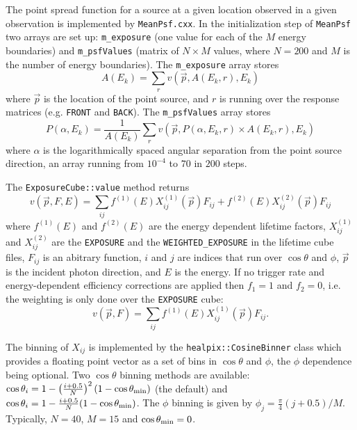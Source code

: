 \documentclass{article}[12pt,a4]
\begin{document}
The point spread function for a source at a given location observed in a given
observation is implemented by {\tt MeanPsf.cxx}.
In the initialization step of {\tt MeanPsf} two arrays are set up:
{\tt m\_exposure} (one value for each of the $M$ energy boundaries) and
{\tt m\_psfValues} (matrix of $N \times M$ values, where $N=200$ and $M$ is
the number of energy boundaries).
The {\tt m\_exposure} array stores
\begin{equation}
A(E_k) = \sum_r v(\vec{p}, A(E_k, r), E_k)
\end{equation}
where 
$\vec{p}$ is the location of the point source, and
$r$ is running over the response matrices (e.g. {\tt FRONT} and {\tt BACK}).
The {\tt m\_psfValues} array stores
\begin{equation}
P(\alpha, E_k) = \frac{1}{A(E_k)} \sum_r v(\vec{p}, P(\alpha, E_k, r) \times A(E_k, r), E_k)
\end{equation}
where
$\alpha$ is the logarithmically spaced angular separation from the point
source direction, an array running from $10^{-4}$ to $70$ in $200$ steps.

The {\tt ExposureCube::value} method returns
\begin{equation}
v(\vec{p}, F, E) = \sum_{ij} f^{(1)}(E) X_{ij}^{(1)}(\vec{p}) F_{ij} + f^{(2)}(E) X_{ij}^{(2)}(\vec{p}) F_{ij}
\end{equation}
where 
$f^{(1)}(E)$ and $f^{(2)}(E)$ are the energy dependent lifetime factors,
$X_{ij}^{(1)}$ and $X_{ij}^{(2)}$ are the {\tt EXPOSURE} and the 
{\tt WEIGHTED\_EXPOSURE} in the lifetime cube files,
$F_{ij}$ is an abitrary function,
$i$ and $j$ are indices that run over $\cos \theta$ and $\phi$,
$\vec{p}$ is the incident photon direction, and
$E$ is the energy.
If no trigger rate and energy-dependent efficiency corrections are
applied then $f_1=1$ and $f_2=0$, i.e. the weighting is only done
over the {\tt EXPOSURE} cube:
\begin{equation}
v(\vec{p}, F) = \sum_{ij} f^{(1)}(E) X_{ij}^{(1)}(\vec{p}) F_{ij} .
\end{equation}

The binning of $X_{ij}$ is implemented by the {\tt healpix::CosineBinner} class which
provides a floating point vector as a set of bins in $\cos \theta$ and $\phi$, the
$\phi$ dependence being optional.
Two $\cos \theta$ binning methods are available:
$\cos \theta_i = 1 - \left( \frac{i+0.5}{N} \right)^2 (1 - \cos \theta_{\rm min})$
(the default) and
$\cos \theta_i = 1 - \frac{i+0.5}{N} (1 - \cos \theta_{\rm min})$.
The $\phi$ binning is given by
$\phi_j = \frac{\pi}{4} (j+0.5) / M$.
Typically, $N=40$, $M=15$ and $\cos \theta_{\rm min} = 0$.
\end{document}
